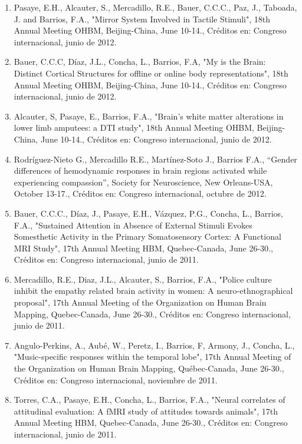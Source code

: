 \begin{enumerate}
\item Pasaye, E.H., Alcauter, S., Mercadillo, R.E., Bauer, C.C.C., Paz, J., Taboada, J. and Barrios, F.A., "Mirror System 
Involved in Tactile Stimuli", 18th Annual Meeting OHBM, Beijing-China, June 10-14., Créditos en: Congreso internacional, 
junio de 2012.

\item Bauer, C.C.C, Díaz, J.L., Concha, L., Barrios, F.A, "My is the Brain: Distinct Cortical Structures for offline or 
online body representations", 18th Annual Meeting OHBM, Beijing-China, June 10-14., Créditos en: Congreso internacional, 
junio de 2012.

\item Alcauter, S, Pasaye, E., Barrios, F.A., "Brain's white matter alterations in lower limb amputees: a DTI study", 18th 
Annual Meeting OHBM, Beijing-China, June 10-14., Créditos en: Congreso internacional, junio de 2012.

\item Rodríguez-Nieto G., Mercadillo R.E., Martínez-Soto J., Barrios F.A., “Gender differences of hemodynamic responses in 
brain regions activated while experiencing compassion”, Society for Neuroscience, New Orleans-USA, October 13-17., Créditos 
en: Congreso internacional, octubre de 2012.

\item Bauer, C.C.C., Díaz, J., Pasaye, E.H., Vázquez, P.G., Concha, L., Barrios, F.A., "Sustained Attention in Absence of 
External Stimuli Evokes Somesthetic Activity in the Primary Somatosensory Cortex: A Functional MRI Study", 17th Annual 
Meeting HBM, Quebec-Canada, June 26-30., Créditos en: Congreso internacional, junio de 2011.

\item Mercadillo, R.E., Diaz, J.L., Alcauter, S., Barrios, F.A., "Police culture inhibit the empathy related brain activity 
in women: A neuro-ethnographical proposal", 17th Annual Meeting of the Organization on Human Brain Mapping, Quebec-Canada, 
June 26-30., Créditos en: Congreso internacional, junio de 2011.

\item Angulo-Perkins, A., Aubé, W., Peretz, I., Barrios, F, Armony, J., Concha, L., "Music-specific responses within the 
temporal lobe", 17th Annual Meeting of the Organization on Human Brain Mapping, Québec-Canada, June 26-30., Créditos en: 
Congreso internacional, noviembre de 2011.

\item Torres, C.A., Pasaye, E.H., Concha, L., Barrios, F.A., "Neural correlates of attitudinal evaluation: A fMRI study of 
attitudes towards animals", 17th Annual Meeting HBM, Quebec-Canada, June 26-30., Créditos en: Congreso internacional, junio 
de 2011.


\end{enumerate}
